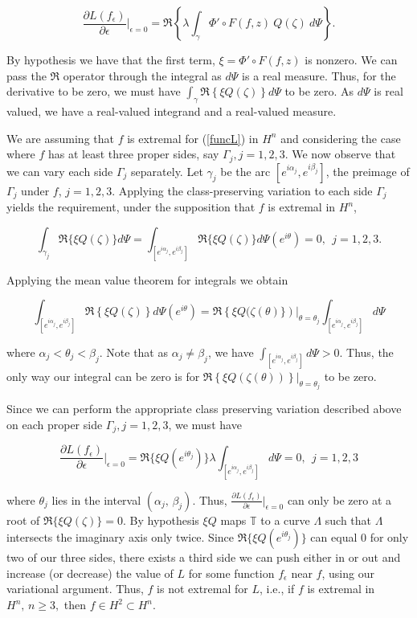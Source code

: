 \documentclass[final]{siamltex}
\newcommand{\T}{\mathbb{T}}
\newcommand{\eps}{\epsilon}
\newcommand{\del}{\partial}
\begin{document}
$$
\frac{\del L(f_{\eps})}{\del \eps} \big \vert_{\eps = 0} =
\Re \left\{ \lambda \int_{\gamma}  \Phi' \circ F(f,z) \  Q(\zeta)\  d\Psi \right\}.
$$

\noindent By hypothesis we have that the first term, $\xi =\Phi' \circ F(f,z)$ is nonzero. We can pass the $\Re$ operator through the integral as $d\Psi$ is a real measure.  Thus, for the derivative to be zero, we must have $\int_{\gamma} \Re \left\{\xi Q(\zeta)\right\} d\Psi$ to be zero.  As $d\Psi$ is real valued, we have a real-valued integrand and a real-valued measure.  

We are assuming that $f$ is extremal for (\ref{funcL}) in $H^n$ and considering the case where $f$ has at least three proper sides, say $\Gamma_j, j=1,2,3$.  We now observe that we can vary each side $\Gamma_j$ separately.  Let $\gamma_j$ be the arc $\left[ e^{i\alpha_j}, e^{i\beta_j} \right]$, the preimage of $\Gamma_j$ under $f$, $j=1,2,3$.  Applying the class-preserving variation to each side $\Gamma_j$ yields the requirement, under the supposition that $f$ is extremal in $H^n$,

$$
\int_{\gamma_j} \Re \{\xi Q(\zeta)\} d\Psi = \int_{\left[ e^{i\alpha_j}, e^{i\beta_j} \right]} \Re \{\xi Q(\zeta)\} d\Psi(e^{i\theta}) = 0, \ \ j=1,2,3.
$$

Applying the mean value theorem for integrals we obtain

$$
\int_{\left[ e^{i\alpha_j}, e^{i\beta_j} \right]}\Re\left\{\xi Q(\zeta) \right\}d\Psi(e^{i\theta}) =\Re \left\{\xi Q(\zeta(\theta)\}\right)|_{\theta=\theta_j}\int_{\left[ e^{i\alpha_j}, e^{i\beta_j} \right]} d\Psi
$$

\noindent where $\alpha_j< \theta_j < \beta_j$.  Note that as $\alpha_j \neq \beta_j$, we have $\int_{\left[ e^{i\alpha_j}, e^{i\beta_j} \right]} d\Psi > 0$.  Thus, the only way our integral can be zero is for $ \Re \left\{\xi Q(\zeta(\theta))\right\}|_{\theta=\theta_j} $ to be zero.  

Since we can perform the appropriate class preserving variation described above on each proper side $\Gamma_j, j=1,2,3$, we must have

\begin{equation}\label{lasteq}
\frac{\del L(f_{\eps})}{\del \eps} \big \vert_{\eps = 0} = \Re \{\xi Q(e^{i\theta_j})\} \lambda \int_{\left[  e^{i\alpha_j}, e^{i\beta_j} \right ]}d\Psi = 0, \ \  j=1,2,3
\end{equation}


\noindent where $\theta_j$ lies in the interval  $\left( \alpha_j, \, \beta_j \right)$.  Thus, $\frac{\partial L(f_{\eps})} {\partial \eps} |_{\eps = 0}$ can only be zero at a root of $\Re\{\xi Q(\zeta)\}=0$.  By hypothesis $\xi Q$ maps $\T$ to a curve $\Lambda$ such that $\Lambda$ intersects the imaginary axis only twice.  Since $\Re \{\xi Q(e^{i\theta_j})\}$ can equal $0$ for only two of our three sides, there exists a third side we can push either in or out and increase (or decrease) the value of $L$ for some function $f_{\eps}$ near $f$, using our variational argument.  Thus, $f$ is not extremal for $L$, i.e., if $f$ is extremal in $H^n,\, n\geq 3,$ then $f\in H^2 \subset H^n$. 
\end{document}
